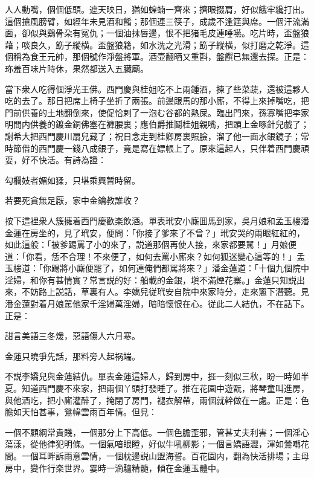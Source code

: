 \begin{myquote}
人人動嘴，個個低頭。遮天映日，猶如蝗蝻一齊來；擠眼掇肩，好似餓牢纔打出。這個搶風膀臂，如經年未見酒和餚；那個連三筷子，成歲不逢筵與席。一個汗流滿面，卻似與鷄骨朶有冤仇；一個油抹唇邊，恨不把猪毛皮連唾嚥。吃片時，盃盤狼藉；啖良久，筯子縱横。盃盤狼籍，如水洗之光滑；筯子縱横，似打磨之乾淨。這個稱為食王元帥，那個號作淨盤將軍。酒壶翻晒又重斟，盤饌已無還去探。正是：珎羞百味片時休，果然都送入五臟廟。
\end{myquote}

當下衆人吃得個淨光王佛。西門慶與桂姐吃不上兩鍾酒，揀了些菜蔬，還被這夥人吃的去了。那日把席上椅子坐折了兩張。前邊跟馬的那小廝，不得上來掉嘴吃，把門前供養的土地翻倒來，使促恰剌了一泡む谷都的熱屎。臨出門來，孫寡嘴把李家明間内供養的鍍金銅佛塞在褲腰裏；應伯爵推鬬桂姐親嘴，把頭上金啄針兒戲了；謝希大把西門慶川扇兒藏了；祝日念走到桂卿房裏照臉，溜了他一面水銀鏡子；常時節借的西門慶一錢八成銀子，竟是寫在嫖帳上了。原來這起人，只伴着西門慶頑耍，好不快活。有詩為證：

\begin{myquote}
勾欄妓者媚如猱，只堪乘興暂時留。

若要死貪無足厭，家中金鑰教誰收？
\end{myquote}

按下這裡衆人簇擁着西門慶歡楽飲酒。單表玳安小廝囬馬到家，吳月娘和孟玉樓潘金蓮在房坐的，見了玳安，便問：「你接了爹來了不曾？」玳安哭的兩眼紅紅的，如此這般：「被爹踢罵了小的來了，説道那個再使人接，來家都要駡！」月娘便道：「你看，恁不合理！不來便了，如何去罵小廝來？如何狐迷變心這等的！」孟玉樓道：「你踢將小廝便罷了，如何連俺們都駡將來？」潘金蓮道：「十個九個院中淫婦，和你有甚情實？常言説的好：船載的金銀，塡不滿煙花寨。」金蓮只知説出來，不妨路上説話，草裏有人。李嬌兒従玳安自院中來家時分，走來窻下潛聽。見潘金蓮對着月娘駡他家千淫婦萬淫婦，暗暗懷恨在心。従此二人結仇，不在話下。正是：

\begin{myquote}
甜言美語三冬煖，惡語傷人六月寒。

金蓮只曉爭先話，那料旁人起祸端。
\end{myquote}

不説李嬌兒與金蓮結仇。單表金蓮這婦人，歸到房中，捱一刻似三秋，盼一時如半夏。知道西門慶不來家，把兩個丫頭打發睡了。推在花園中遊翫，將琴童叫進房，與他酒吃，把小廝灌醉了，掩閉了房門，褪衣解帶，兩個就幹做在一處。正是：色膽如天怕甚事，鴛幃雲雨百年情。但見：

\begin{myquote}
一個不顧綱常貴賤，一個那分上下高低。一個色膽歪邪，管甚丈夫利害；一個淫心蕩漾，從他律犯明條。一個氣喑眼瞪，好似牛吼柳影；一個言嬌語澀，渾如鶯囀花間。一個耳畔訴雨意雲情，一個枕邊説山盟海誓。百花園内，翻為快活排場；主母房中，變作行楽世界。霎時一滴驢精髓，傾在金蓮玉體中。
\end{myquote}

